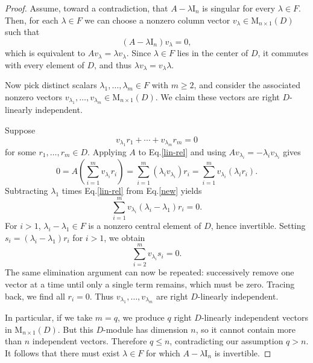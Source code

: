 \documentclass[11pt]{article}
\theoremstyle{definition}
\begin{document}
{{{{				
				\begin{proof}
					Assume, toward a contradiction, that $A - \lambda \mathrm{I}_n$ is singular for every $\lambda \in F$. Then, for each $\lambda \in F$ we can choose a nonzero column vector $v_\lambda \in \mathrm{M}_{n\times 1}(D)$ such that $$(A - \lambda \mathrm{I}_n) v_\lambda = 0,$$ which is equivalent to $
					A v_\lambda = \lambda v_\lambda.
					$ Since $\lambda \in F$ lies in the center of $D$, it commutes with every element of $D$, and thus $
					\lambda v_\lambda = v_\lambda \lambda.
					$
					
					Now pick distinct scalars $\lambda_1, \dots, \lambda_m \in F$ with $m \ge 2$, and consider the associated nonzero vectors $
					v_{\lambda_1}, \dots, v_{\lambda_m} \in \mathrm{M}_{n\times 1}(D).
					$ 	We claim these vectors are right $D$-linearly independent.
					
					Suppose
					\begin{equation}\label{lin-rel}
						v_{\lambda_1} r_1 + \cdots + v_{\lambda_m} r_m = 0
					\end{equation}
					for some $r_1, \dots, r_m \in D$. Applying $A$ to Eq.\eqref{lin-rel} and using $A v_{\lambda_i} = -\lambda_i v_{\lambda_i}$ gives
					\begin{equation}
						0 = A\left(\sum_{i=1}^m v_{\lambda_i} r_i \right)
						= \sum_{i=1}^m (\lambda_i v_{\lambda_i}) r_i
						= \sum_{i=1}^m v_{\lambda_i} (\lambda_i r_i). \label{new}
					\end{equation}
					Subtracting $\lambda_1$ times Eq.\eqref{lin-rel} from Eq.\eqref{new} yields
					\[
					\sum_{i=1}^m v_{\lambda_i} (\lambda_i - \lambda_1) r_i = 0.
					\]
					For $i > 1$, $\lambda_i - \lambda_1 \in F$ is a nonzero central element of $D$, hence invertible. Setting $s_i = (\lambda_i - \lambda_1) r_i$ for $i>1$, we obtain
					\[
					\sum_{i=2}^m v_{\lambda_i} s_i = 0.
					\]
					The same elimination argument can now be repeated: successively remove one vector at a time until only a single term remains, which must be zero. Tracing back, we find all $r_i = 0$. Thus  $v_{\lambda_1}, \dots, v_{\lambda_m}$
					are right $D$-linearly independent.
					
					In particular, if we take $m = q$, we produce $q$ right $D$-linearly independent vectors in $\mathrm{M}_{n\times 1}(D)$. But this $D$-module has dimension $n$, so it cannot contain more than $n$ independent vectors. Therefore $q \le n$, contradicting our assumption $q > n$.	It follows that there must exist $\lambda \in F$ for which $A - \lambda \mathrm{I}_n$ is invertible.
				\end{proof}
				
}}}}
\end{document}
